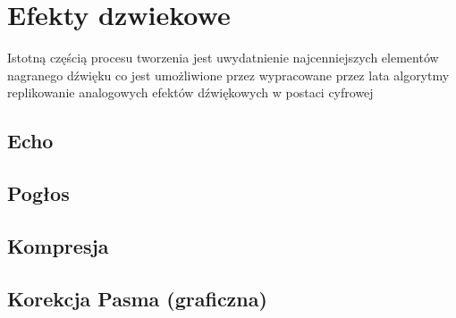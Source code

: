 \documentclass[11pt]{aghdpl}
\begin{document}
\chapter{Efekty dzwiekowe}

\par
Istotną częścią procesu tworzenia jest uwydatnienie najcenniejszych elementów nagranego dźwięku co jest umożliwione przez wypracowane przez lata algorytmy replikowanie analogowych efektów dźwiękowych w postaci cyfrowej 
\section{Echo}
\section{Pogłos}
\section{Kompresja}
\section{Korekcja Pasma (graficzna)}

%

\printbibliography
\end{document}
